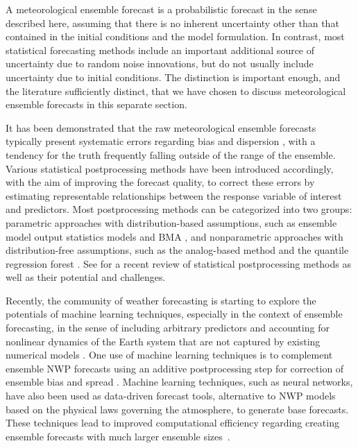 \documentclass[11pt]{article}
\begin{document}
A meteorological ensemble forecast is a probabilistic forecast in the sense described here, assuming that there is no inherent uncertainty other than that contained in the initial conditions and the model formulation. In contrast, most statistical forecasting methods include an important additional source of uncertainty due to random noise innovations, but do not usually include uncertainty due to initial conditions. The distinction is important enough, and the literature sufficiently distinct, that we have chosen to discuss meteorological ensemble forecasts in this separate section.

It has been demonstrated that the raw meteorological ensemble forecasts typically present systematic errors regarding bias \citep{Atger2003-lx,Mass2003-bc} and dispersion \citep{Buizza2005-wf,Sloughter2010-ae}, with a tendency for the truth frequently falling outside of the range of the ensemble. Various statistical postprocessing methods have been introduced accordingly, with the aim of improving the forecast quality, to correct these errors by estimating representable relationships between the response variable of interest and predictors. Most postprocessing methods can be categorized into two groups: parametric approaches with distribution-based assumptions, such as ensemble model output statistics \citep[EMOS,][]{Gneiting2005-ua} models and BMA \citep{Raftery2005-vu}, and nonparametric approaches with distribution-free assumptions, such as the analog-based method \citep[e.g.,][]{Delle_Monache2013-os} and the quantile regression forest \citep{Taillardat2019-ni}. See \citet{Vannitsem2021-bg} for a recent review of statistical postprocessing methods as well as their potential and challenges.

Recently, the community of weather forecasting is starting to explore the potentials of machine learning techniques, especially in the context of ensemble forecasting, in the sense of including arbitrary predictors and accounting for nonlinear dynamics of the Earth system that are not captured by existing numerical models \citep{Dueben2021-fe}. One use of machine learning techniques is to complement ensemble NWP \citep[numerical weather prediction, see, e.g.,][for a summary of its revolution]{Bauer2015-dg,Benjamin2019-zp} forecasts using an additive postprocessing step for correction of ensemble bias and spread \citep{Rasp2018-zu,Scher2018-dm,Gronquist2021-no}. Machine learning techniques, such as neural networks, have also been used as data-driven forecast tools, alternative to NWP models based on the physical laws governing the atmosphere, to generate base forecasts. These techniques lead to improved computational efficiency regarding creating ensemble forecasts with much larger ensemble sizes~\citep{Dueben2018-ln,Scher2018-of,Rasp2021-az,Scher2021-ee}.
\end{document}
